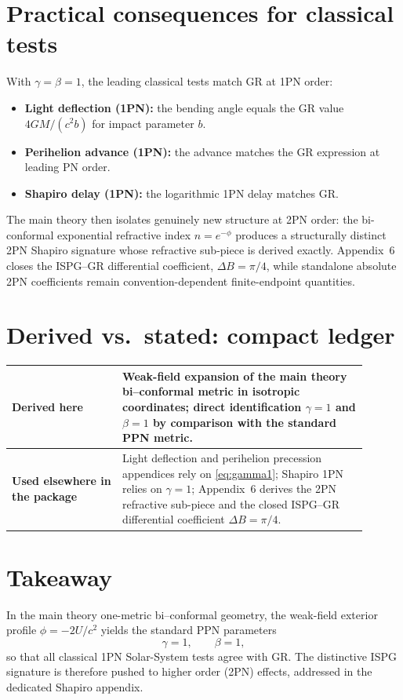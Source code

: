 \documentclass[11pt]{article}
\begin{document}
\section{Practical consequences for classical tests}\label{sec:tests}
With $\gamma=\beta=1$, the leading classical tests match GR at 1PN order:
\begin{itemize}
\item \textbf{Light deflection (1PN):} the bending angle equals the GR value $4GM/(c^2 b)$ for impact parameter $b$.
\item \textbf{Perihelion advance (1PN):} the advance matches the GR expression at leading PN order.
\item \textbf{Shapiro delay (1PN):} the logarithmic 1PN delay matches GR.
\end{itemize}
The main theory then isolates genuinely new structure at 2PN order: the bi-conformal exponential refractive index $n=e^{-\phi}$ produces a structurally distinct 2PN Shapiro signature whose refractive sub-piece is derived exactly.  Appendix~6 closes the ISPG--GR differential coefficient, $\Delta B=\pi/4$, while standalone absolute 2PN coefficients remain convention-dependent finite-endpoint quantities.

\section{Derived vs.\ stated: compact ledger}\label{sec:ledger_app4}
\begin{center}
\begin{tabular}{@{}p{0.28\linewidth}p{0.62\linewidth}@{}}
\toprule
\textbf{Derived here} &
Weak-field expansion of the main theory bi--conformal metric in isotropic coordinates; direct identification $\gamma=1$ and $\beta=1$ by comparison with the standard PPN metric.\\
\midrule
\textbf{Used elsewhere in the package} &
Light deflection and perihelion precession appendices rely on \eqref{eq:gamma1}; Shapiro 1PN relies on $\gamma=1$; Appendix~6 derives the 2PN refractive sub-piece and the closed ISPG--GR differential coefficient $\Delta B=\pi/4$.\\
\bottomrule
\end{tabular}
\end{center}

\section*{Takeaway}
In the main theory one-metric bi--conformal geometry, the weak-field exterior profile $\phi=-2U/c^2$ yields the standard PPN parameters
\[
\gamma=1,\qquad \beta=1,
\]
so that all classical 1PN Solar-System tests agree with GR. The distinctive ISPG signature is therefore pushed to higher order (2PN) effects, addressed in the dedicated Shapiro appendix.
\end{document}
